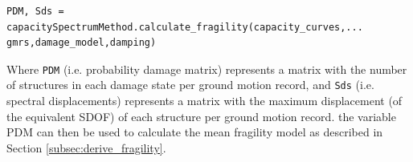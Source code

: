 \begin{Verbatim}[frame=single, commandchars=\\\{\}, samepage=true]
PDM, Sds = capacitySpectrumMethod.calculate_fragility(capacity_curves,...
gmrs,damage_model,damping)
\end{Verbatim}

Where \verb=PDM= (i.e. probability damage matrix) represents a matrix with the number of structures in each damage state per ground motion record, and \verb=Sds= (i.e. spectral displacements) represents a matrix with the maximum displacement (of the equivalent SDOF) of each structure per ground motion record. the variable PDM can then be used to calculate the mean fragility model as described in Section \ref{subsec:derive_fragility}.



